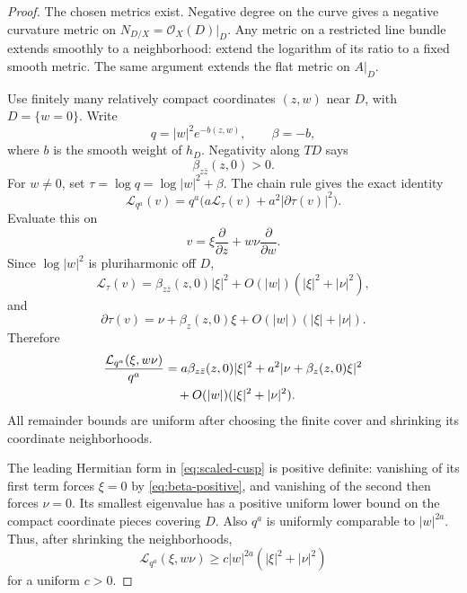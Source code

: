 \documentclass[11pt]{amsart}
\theoremstyle{definition}
\theoremstyle{remark}
\numberwithin{equation}{section}
\newcommand{\OO}{\mathcal O}
\newcommand{\Levi}{\mathcal L}
\begin{document}
\begin{proof}
The chosen metrics exist. Negative degree on the curve gives a negative
curvature metric on $N_{D/X}=\OO_X(D)|_D$. Any metric on a restricted
line bundle extends smoothly to a neighborhood: extend the logarithm
of its ratio to a fixed smooth metric. The same argument extends the
flat metric on $A|_D$.

Use finitely many relatively compact coordinates $(z,w)$ near $D$,
with $D=\{w=0\}$. Write
\[
 q=|w|^2e^{-b(z,w)},\qquad \beta=-b,
\]
where $b$ is the smooth weight of $h_D$. Negativity along $TD$ says
\begin{equation}\label{eq:beta-positive}
 \beta_{z\bar z}(z,0)>0.
\end{equation}
For $w\ne0$, set $\tau=\log q=\log|w|^2+\beta$. The chain rule gives
the exact identity
\begin{equation}\label{eq:cusp-exact}
 \Levi_{q^a}(v)
 =q^a\bigl(a\Levi_{\tau}(v)+a^2|\partial\tau(v)|^2\bigr).
\end{equation}
Evaluate this on
\[
 v=\xi\frac{\partial}{\partial z}
    +w\nu\frac{\partial}{\partial w}.
\]
Since $\log|w|^2$ is pluriharmonic off $D$,
\[
 \Levi_{\tau}(v)
 =\beta_{z\bar z}(z,0)|\xi|^2
   +O(|w|)(|\xi|^2+|\nu|^2),
\]
and
\[
 \partial\tau(v)
 =\nu+\beta_z(z,0)\xi+O(|w|)(|\xi|+|\nu|).
\]
Therefore
\begin{align}\label{eq:scaled-cusp}
 \frac{\Levi_{q^a}(\xi,w\nu)}{q^a}
 &=a\beta_{z\bar z}(z,0)|\xi|^2
   +a^2|\nu+\beta_z(z,0)\xi|^2\notag\\
 &\hspace{1em}+O(|w|)(|\xi|^2+|\nu|^2).
\end{align}
All remainder bounds are uniform after choosing the finite cover and
shrinking its coordinate neighborhoods.

The leading Hermitian form in \eqref{eq:scaled-cusp} is positive
definite: vanishing of its first term forces $\xi=0$ by
\eqref{eq:beta-positive}, and vanishing of the second then forces
$\nu=0$. Its smallest eigenvalue has a positive uniform lower bound on
the compact coordinate pieces covering $D$. Also $q^a$ is uniformly
comparable to $|w|^{2a}$. Thus, after shrinking the neighborhoods,
\begin{equation}\label{eq:cusp-lower}
 \Levi_{q^a}(\xi,w\nu)
 \ge c|w|^{2a}(|\xi|^2+|\nu|^2)
\end{equation}
for a uniform $c>0$.


\end{proof}
\end{document}
